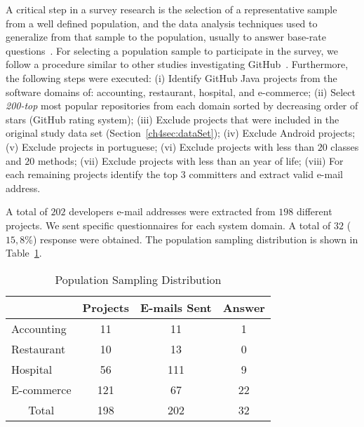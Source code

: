 A critical step in a survey research is the selection of a representative sample from a well defined population, and the data analysis techniques used to generalize from that sample to the population, usually to answer base-rate questions~\citep{Easterbrook2008}. For selecting a population sample to participate in the survey, we follow a procedure similar to other studies investigating GitHub~\citep{Salvaneschi:2014,Kalliamvakou:2014}. Furthermore, the following steps were executed: (i) Identify GitHub Java projects from the software domains of: accounting, restaurant, hospital, and e-commerce;
(ii) Select  \textit{200-top} most popular repositories from each domain sorted by decreasing order of stars (GitHub rating system);
(iii) Exclude projects that were included in the original study data set (Section~\ref{ch4sec:dataSet});
(iv) Exclude Android projects;
(v) Exclude projects in portuguese;
(vi) Exclude projects with less than $20$ classes and $20$ methods;
(vii) Exclude projects with less than an year of life;
(viii) For each remaining projects identify the top $3$ committers and extract valid e-mail address.


A total of $202$ developers e-mail addresses were extracted from $198$ different projects. We sent specific questionnaires for each system domain. A total of $32$ ($15,8$\%) response were obtained. The population sampling distribution is shown in Table~\ref{tab:survey}.

\begin{table}[!h]
\centering
\caption{Population Sampling Distribution}
\label{tab:survey}
\scriptsize
\begin{tabular}{|l|c|c|c|}
\hline
\rowcolor[HTML]{EFEFEF} 
\multicolumn{1}{|c|}{\cellcolor[HTML]{EFEFEF}\textbf{Domain}} & \textbf{Projects} & \textbf{E-mails Sent} & \textbf{Answer} \\ \hline
Accounting                                           & 11       & 11           & 1      \\ \hline
Restaurant                                           & 10       & 13           & 0      \\ \hline
Hospital                                             & 56       & 111          & 9      \\ \hline
E-commerce                                           & 121      & 67           & 22     \\ \hline
\multicolumn{1}{|c|}{Total}                          & 198      & 202          & 32     \\ \hline
\end{tabular}
\end{table}


